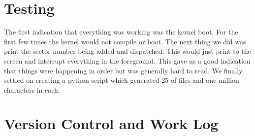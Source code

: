 \documentclass[letterpaper,10pt,serif,draftclsnofoot,onecolumn,compsoc,titlepage]{IEEEtran}
\begin{document}
\section{Testing}
The first indication that everything was working was the kernel boot. For 
the first few times the kernel would not compile or boot. The next thing 
we did was print the sector number being added and dispatched. This would 
just print to the screen and interrupt everything in the foreground. 
This gave us a good indication that things were happening in order but 
was generally hard to read. We finally settled on creating a python 
script which generated 25 of files and one million characters in 
each. 
\section{Version Control and Work Log}
\newpage
\end{document}
